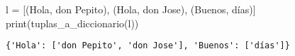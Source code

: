 \documentclass[
  letterpaper,
  DIV=11,
  numbers=noendperiod]{scrreprt}
\newenvironment{Shaded}{\begin{snugshade}}{\end{snugshade}}
\newcommand{\BuiltInTok}[1]{\textcolor[rgb]{0.00,0.23,0.31}{#1}}
\newcommand{\NormalTok}[1]{\textcolor[rgb]{0.00,0.23,0.31}{#1}}
\newcommand{\OperatorTok}[1]{\textcolor[rgb]{0.37,0.37,0.37}{#1}}
\newcommand{\StringTok}[1]{\textcolor[rgb]{0.13,0.47,0.30}{#1}}
\begin{document}
\begin{Shaded}
\begin{Highlighting}[]
\NormalTok{l }\OperatorTok{=}\NormalTok{ [(}\StringTok{\textquotesingle{}Hola\textquotesingle{}}\NormalTok{, }\StringTok{\textquotesingle{}don Pepito\textquotesingle{}}\NormalTok{), (}\StringTok{\textquotesingle{}Hola\textquotesingle{}}\NormalTok{, }\StringTok{\textquotesingle{}don Jose\textquotesingle{}}\NormalTok{), (}\StringTok{\textquotesingle{}Buenos\textquotesingle{}}\NormalTok{, }\StringTok{\textquotesingle{}días\textquotesingle{}}\NormalTok{)]}
\BuiltInTok{print}\NormalTok{(tuplas\_a\_diccionario(l))}
\end{Highlighting}
\end{Shaded}

\begin{verbatim}
{'Hola': ['don Pepito', 'don Jose'], 'Buenos': ['días']}
\end{verbatim}
\end{document}
